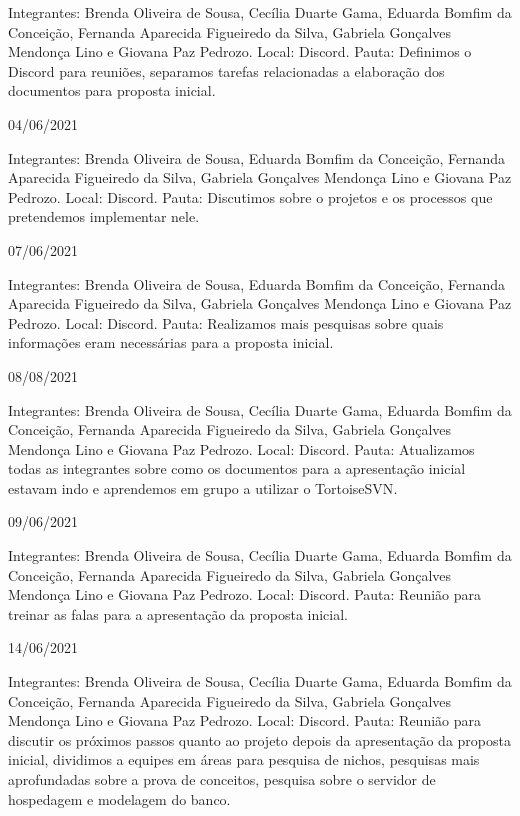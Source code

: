 \begin{apendicesenv}
\begin{flushleft}
Integrantes: Brenda Oliveira de Sousa, Cecília Duarte Gama, Eduarda Bomfim da Conceição, Fernanda Aparecida Figueiredo da Silva, Gabriela Gonçalves Mendonça Lino e Giovana Paz Pedrozo.
\newline
Local: \gls{Discord}.
\newline
Pauta:  Definimos o \gls{Discord} para reuniões, separamos tarefas relacionadas a elaboração dos documentos para proposta inicial.

04/06/2021 

Integrantes: Brenda Oliveira de Sousa, Eduarda Bomfim da Conceição, Fernanda Aparecida Figueiredo da Silva, Gabriela Gonçalves Mendonça Lino e Giovana Paz Pedrozo.
\newline
Local: \gls{Discord}.
\newline
Pauta: Discutimos sobre o projetos e os processos que pretendemos implementar nele.

07/06/2021 

Integrantes: Brenda Oliveira de Sousa, Eduarda Bomfim da Conceição, Fernanda Aparecida Figueiredo da Silva, Gabriela Gonçalves Mendonça Lino e Giovana Paz Pedrozo.
\newline
Local: \gls{Discord}.
\newline
Pauta: Realizamos mais pesquisas sobre quais informações eram necessárias para a proposta inicial.

08/08/2021 

Integrantes: Brenda Oliveira de Sousa, Cecília Duarte Gama, Eduarda Bomfim da Conceição, Fernanda Aparecida Figueiredo da Silva, Gabriela Gonçalves Mendonça Lino e Giovana Paz Pedrozo.
\newline
Local: \gls{Discord}.
\newline
Pauta: Atualizamos todas as integrantes sobre como os documentos para a apresentação inicial estavam indo e aprendemos em grupo a utilizar o \gls{TortoiseSVN}.

09/06/2021 

Integrantes: Brenda Oliveira de Sousa, Cecília Duarte Gama, Eduarda Bomfim da Conceição, Fernanda Aparecida Figueiredo da Silva, Gabriela Gonçalves Mendonça Lino e Giovana Paz Pedrozo.
\newline
Local: \gls{Discord}.
\newline
Pauta:  Reunião para treinar as falas para a apresentação da proposta inicial.

14/06/2021 

Integrantes: Brenda Oliveira de Sousa, Cecília Duarte Gama, Eduarda Bomfim da Conceição, Fernanda Aparecida Figueiredo da Silva, Gabriela Gonçalves Mendonça Lino e Giovana Paz Pedrozo.
\newline
Local: \gls{Discord}.
\newline
Pauta: Reunião para discutir os próximos passos quanto ao projeto depois da apresentação da proposta inicial, dividimos a equipes em áreas para pesquisa de nichos, pesquisas mais aprofundadas sobre a prova de conceitos, pesquisa sobre o servidor de hospedagem e modelagem do banco.


\end{flushleft}
\end{apendicesenv}
